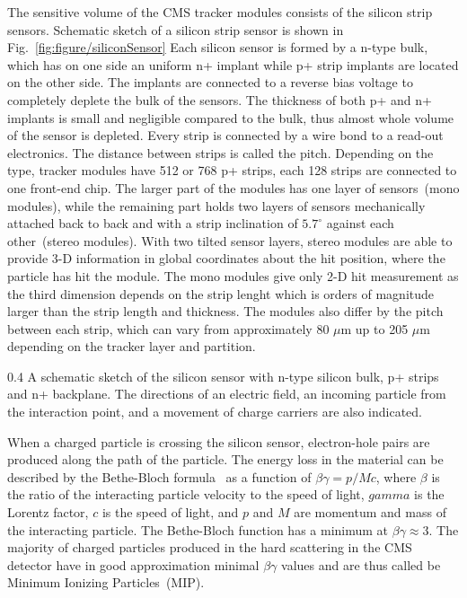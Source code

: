 The sensitive volume of the CMS tracker modules consists of the silicon strip sensors. Schematic sketch of a silicon strip sensor is shown in Fig.~\ref{fig:figure/siliconSensor} Each silicon sensor is formed by a n-type bulk, which has on one side an uniform n+ implant while p+ strip implants are located on the other side. The implants are connected to a reverse bias voltage to completely deplete the bulk of the sensors. The thickness of both p+ and n+ implants is small and negligible compared to the bulk, thus almost whole volume of the sensor is depleted. Every strip is connected by a wire bond to a read-out electronics. The distance between strips is called the pitch. Depending on the type, tracker modules have 512 or 768 p+ strips, each 128 strips are connected to one front-end chip. The larger part of the modules has one layer of sensors~(mono modules), while the remaining part holds two layers of sensors  mechanically attached back to back and with a strip inclination of $5.7^{\circ}$ against each other~(stereo modules). With two tilted sensor layers, stereo modules are able to provide 3-D information in global coordinates about the hit position, where the particle has hit the module. The mono modules give only 2-D hit measurement as the third dimension depends on the strip lenght which is orders of magnitude larger than the strip length and thickness. The modules also differ by the pitch between each strip, which can vary from approximately 80 $\mu$m up to 205 $\mu$m depending on the tracker layer and partition.

                 {0.4}       %
                 {A schematic sketch of the silicon sensor with n-type silicon bulk, p+ strips and n+ backplane. The directions of an electric field, an incoming particle from the interaction point, and a movement of charge carriers are also indicated. } %

When a charged particle is crossing the silicon sensor, electron-hole pairs are produced along the path of the particle. The energy loss in the material can be described by the Bethe-Bloch formula~\cite{Groom:2000sm} as a function of $\beta\gamma = p/Mc$, where $\beta$ is the ratio of the interacting particle velocity to the speed of light, $gamma$ is the Lorentz factor, $c$ is the speed of light, and $p$ and $M$ are momentum and mass of the interacting particle. The Bethe-Bloch function has a minimum at $\beta\gamma \approx 3$. The majority of charged particles produced in the hard scattering in the CMS detector have in good approximation minimal $\beta\gamma$ values and are thus called be Minimum Ionizing Particles~(MIP).

